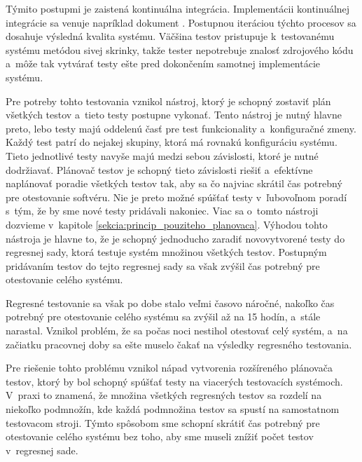 Týmito postupmi je zaistená kontinuálna integrácia. 
Implementácii kontinuálnej integrácie sa venuje napríklad dokument 
\cite{Continuous_integration_implementation}. 
Postupnou iteráciou týchto procesov sa dosahuje výsledná kvalita systému. 
Väčšina testov pristupuje k~testovanému systému metódou sivej skrinky, 
takže tester nepotrebuje znalosť zdrojového kódu a~môže tak vytvárať 
testy ešte pred dokončením samotnej implementácie systému. 

Pre potreby tohto testovania vznikol nástroj, ktorý je schopný zostaviť 
plán všetkých testov a~tieto testy postupne vykonať. Tento nástroj je
nutný hlavne preto, lebo testy majú oddelenú časť pre
test funkcionality a~konfiguračné zmeny. Každý test patrí do nejakej 
skupiny, ktorá má rovnakú konfiguráciu systému. 
Tieto jednotlivé testy navyše majú medzi sebou závislosti, ktoré je 
nutné dodržiavať. Plánovač testov je schopný tieto závislosti riešiť 
a~efektívne naplánovať poradie všetkých testov tak, aby sa čo najviac 
skrátil čas potrebný pre otestovanie softvéru. Nie je preto možné spúšťať
testy v~ľubovoľnom poradí s~tým, že by sme nové testy pridávali nakoniec.
Viac sa o~tomto nástroji dozvieme v~kapitole
\ref{sekcia:princip_pouziteho_planovaca}.
Výhodou tohto nástroja je hlavne to, že je schopný jednoducho zaradiť 
novovytvorené testy do regresnej sady, ktorá testuje systém množinou 
všetkých testov. Postupným pridávaním testov do tejto regresnej sady sa 
však zvýšil čas potrebný pre otestovanie celého systému.

Regresné testovanie sa však po dobe stalo veľmi časovo náročné, nakoľko 
čas potrebný pre otestovanie celého systému sa zvýšil až na 15 hodín, 
a~stále narastal.
Vznikol problém, že sa počas noci nestihol otestovať celý systém, a~na 
začiatku pracovnej doby sa ešte muselo čakať na výsledky regresného 
testovania. 

Pre riešenie tohto problému vznikol nápad vytvorenia 
rozšíreného plánovača testov, ktorý by bol schopný spúšťať testy na 
viacerých testovacích systémoch.
V~praxi to znamená, že množina všetkých regresných testov sa rozdelí na 
niekoľko podmnožín, kde každá podmnožina testov sa spustí na samostatnom
testovacom stroji. 
Týmto spôsobom sme schopní skrátiť čas potrebný pre otestovanie celého 
systému bez toho, aby sme museli znížiť počet testov v~regresnej sade. 

